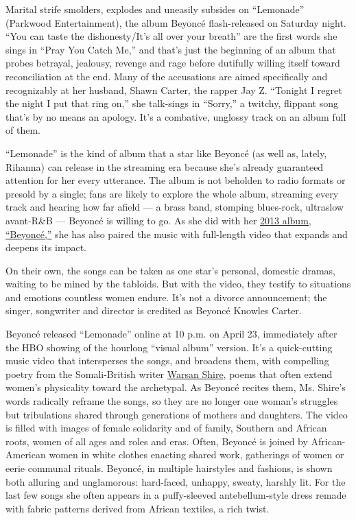 Marital strife smolders, explodes and uneasily subsides on ``Lemonade''
(Parkwood Entertainment), the album Beyoncé flash-released on Saturday
night. ``You can taste the dishonesty/It's all over your breath'' are
the first words she sings in ``Pray You Catch Me,'' and that's just the
beginning of an album that probes betrayal, jealousy, revenge and rage
before dutifully willing itself toward reconciliation at the end. Many
of the accusations are aimed specifically and recognizably at her
husband, Shawn Carter, the rapper Jay Z. ``Tonight I regret the night I
put that ring on,'' she talk-sings in ``Sorry,'' a twitchy, flippant
song that's by no means an apology. It's a combative, unglossy track on
an album full of them.

``Lemonade'' is the kind of album that a star like Beyoncé (as well as,
lately, Rihanna) can release in the streaming era because she's already
guaranteed attention for her every utterance. The album is not beholden
to radio formats or presold by a single; fans are likely to explore the
whole album, streaming every track and hearing how far afield --- a
brass band, stomping blues-rock, ultraslow avant-R\&B --- Beyoncé is
willing to go. As she did with her
\href{http://www.nytimes.com/2013/12/14/arts/music/beyonces-new-album-is-steamy-and-sleek.html?_r=0}{2013
album, ``Beyoncé,''} she has also paired the music with full-length
video that expands and deepens its impact.

On their own, the songs can be taken as one star's personal, domestic
dramas, waiting to be mined by the tabloids. But with the video, they
testify to situations and emotions countless women endure. It's not a
divorce announcement; the singer, songwriter and director is credited as
Beyoncé Knowles Carter.

Beyoncé released ``Lemonade'' online at 10 p.m. on April 23, immediately
after the HBO showing of the hourlong ``visual album'' version. It's a
quick-cutting music video that intersperses the songs, and broadens
them, with compelling poetry from the Somali-British writer
\href{http://www.newyorker.com/culture/cultural-comment/the-writing-life-of-a-young-prolific-poet-warsan-shire}{Warsan
Shire}, poems that often extend women's physicality toward the
archetypal. As Beyoncé recites them, Ms. Shire's words radically reframe
the songs, so they are no longer one woman's struggles but tribulations
shared through generations of mothers and daughters. The video is filled
with images of female solidarity and of family, Southern and African
roots, women of all ages and roles and eras. Often, Beyoncé is joined by
African-American women in white clothes enacting shared work, gatherings
of women or eerie communal rituals. Beyoncé, in multiple hairstyles and
fashions, is shown both alluring and unglamorous: hard-faced, unhappy,
sweaty, harshly lit. For the last few songs she often appears in a
puffy-sleeved antebellum-style dress remade with fabric patterns derived
from African textiles, a rich twist.

